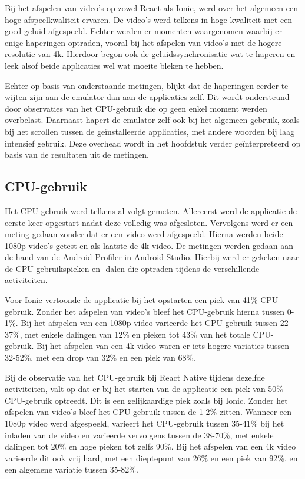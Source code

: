 Bij het afspelen van video's op zowel React als Ionic, werd over het algemeen een hoge afspeelkwaliteit ervaren. De video's werd telkens in hoge kwaliteit met een goed geluid afgespeeld. Echter werden er momenten waargenomen waarbij er enige haperingen optraden, vooral bij het afspelen van video's met de hogere resolutie van 4k. Hierdoor begon ook de geluidssynchronisatie wat te haperen en leek alsof beide applicaties wel wat moeite bleken te hebben.

Echter op basis van onderstaande metingen, blijkt dat de haperingen eerder te wijten zijn aan de emulator dan aan de applicaties zelf. Dit wordt ondersteund door observaties van het CPU-gebruik die op geen enkel moment werden overbelast. Daarnaast hapert de emulator zelf ook bij het algemeen gebruik, zoals bij het scrollen tussen de geïnstalleerde applicaties, met andere woorden bij laag intensief gebruik. Deze overhead wordt in het hoofdstuk verder geïnterpreteerd op basis van de resultaten uit de metingen.


\subsection{CPU-gebruik}
\label{subsec:cpu-gebruik}

Het CPU-gebruik werd telkens al volgt gemeten. Allereerst werd de applicatie de eerste keer opgestart nadat deze volledig was afgesloten. Vervolgens werd er een meting gedaan zonder dat er een video werd afgespeeld. Hierna werden beide 1080p video's getest en als laatste de 4k video. De metingen werden gedaan aan de hand van de Android Profiler in Android Studio. Hierbij werd er gekeken naar de CPU-gebruikspieken en -dalen die optraden tijdens de verschillende activiteiten.

Voor Ionic vertoonde de applicatie bij het opstarten een piek van 41\% CPU-gebruik. Zonder het afspelen van video's bleef het CPU-gebruik hierna tussen 0-1\%. Bij het afspelen van een 1080p video varieerde het CPU-gebruik tussen 22-37\%, met enkele dalingen van 12\% en pieken tot 43\% van het totale CPU-gebruik. Bij het afspelen van een 4k video waren er iets hogere variaties tussen 32-52\%, met een drop van 32\% en een piek van 68\%.

Bij de observatie van het CPU-gebruik bij React Native tijdens dezelfde activiteiten, valt op dat er bij het starten van de applicatie een piek van 50\% CPU-gebruik optreedt. Dit is een gelijkaardige piek zoals bij Ionic. Zonder het afspelen van video's bleef het CPU-gebruik tussen de 1-2\% zitten. Wanneer een 1080p video werd afgespeeld, varieert het CPU-gebruik tussen 35-41\% bij het inladen van de video en varieerde vervolgens tussen de 38-70\%, met enkele dalingen tot 20\% en hoge pieken tot zelfs 90\%. Bij het afspelen van een 4k video varieerde dit ook vrij hard, met een dieptepunt van 26\% en een piek van 92\%, en een algemene variatie tussen 35-82\%. 

